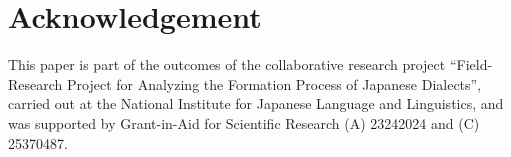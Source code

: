 \documentclass[output=paper]{LSP/langsci}
\begin{document}
\section*{Acknowledgement}

This paper is part of the outcomes of the collaborative research project “Field-Research Project for Analyzing the Formation Process of Japanese Dialects”, carried out at the National Institute for Japanese Language and Linguistics, and was supported by Grant-in-Aid for Scientific Research (A) 23242024 and (C) 25370487.

\printbibliography[heading=subbibliography,notkeyword=this]
\end{document}

